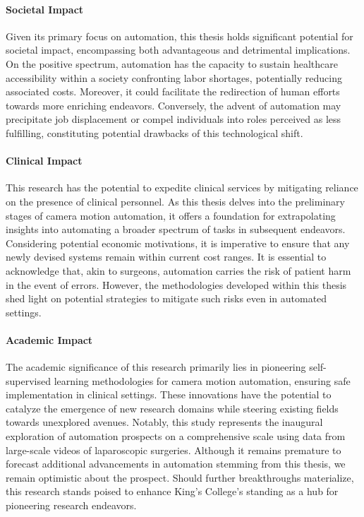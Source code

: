\paragraph{Societal Impact} Given its primary focus on automation, this thesis holds significant potential for societal impact, encompassing both advantageous and detrimental implications. On the positive spectrum, automation has the capacity to sustain healthcare accessibility within a society confronting labor shortages, potentially reducing associated costs. Moreover, it could facilitate the redirection of human efforts towards more enriching endeavors. Conversely, the advent of automation may precipitate job displacement or compel individuals into roles perceived as less fulfilling, constituting potential drawbacks of this technological shift.

\paragraph{Clinical Impact} This research has the potential to expedite clinical services by mitigating reliance on the presence of clinical personnel. As this thesis delves into the preliminary stages of camera motion automation, it offers a foundation for extrapolating insights into automating a broader spectrum of tasks in subsequent endeavors. Considering potential economic motivations, it is imperative to ensure that any newly devised systems remain within current cost ranges. It is essential to acknowledge that, akin to surgeons, automation carries the risk of patient harm in the event of errors. However, the methodologies developed within this thesis shed light on potential strategies to mitigate such risks even in automated settings.

\paragraph{Academic Impact} The academic significance of this research primarily lies in pioneering self-supervised learning methodologies for camera motion automation, ensuring safe implementation in clinical settings. These innovations have the potential to catalyze the emergence of new research domains while steering existing fields towards unexplored avenues. Notably, this study represents the inaugural exploration of automation prospects on a comprehensive scale using data from large-scale videos of laparoscopic surgeries. Although it remains premature to forecast additional advancements in automation stemming from this thesis, we remain optimistic about the prospect. Should further breakthroughs materialize, this research stands poised to enhance King's College's standing as a hub for pioneering research endeavors.
